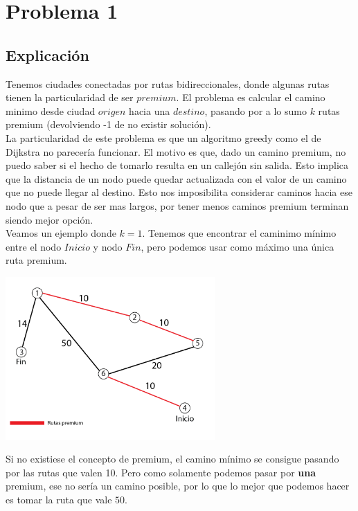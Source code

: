 
\section{Problema 1}

\subsection{Explicación}

Tenemos ciudades conectadas por rutas bidireccionales, donde algunas rutas tienen la particularidad de ser $premium$. El problema es calcular el camino minimo desde ciudad $origen$ hacia una $destino$, pasando por a lo sumo $k$ rutas premium (devolviendo -1 de no existir solución). \\

La particularidad de este problema es que un algoritmo greedy como el de Dijkstra no parecería funcionar. El motivo es que, dado un camino premium, no puedo saber si el hecho de tomarlo resulta en un callejón sin salida. Esto implica que la distancia de un nodo puede quedar actualizada con el valor de un camino que no puede llegar al destino. Esto nos imposibilita considerar caminos hacia ese nodo que a pesar de ser mas largos, por tener menos caminos premium terminan siendo mejor opción. \\

Veamos un ejemplo donde $k = 1$. Tenemos que encontrar el caminimo mínimo entre el nodo $Inicio$ y nodo $Fin$, pero podemos usar como máximo una única ruta premium.

{\centering
	\includegraphics[width=0.6\textwidth]{imagenes/problema1/problema1-c2.png} \\
}

Si no existiese el concepto de premium, el camino mínimo se consigue pasando por las rutas que valen 10. Pero como solamente podemos pasar por \textbf{una} premium, ese no sería un camino posible, por lo que lo mejor que podemos hacer es tomar la ruta que vale $50$.

